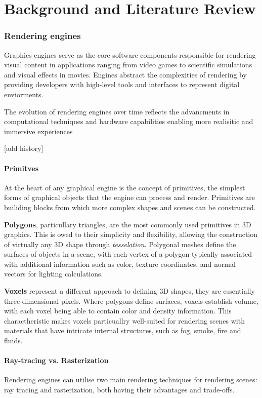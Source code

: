 
\part{Background and Literature Review}
\section{Rendering engines}
Graphics engines serve as the core software components responsible for rendering visual content in applications ranging from video games to scientific simulations and visual effects in movies.
Engines abstract the complexities of rendering by providing developers with high-level tools and interfaces to represent digital enviorments.

The evolution of rendering engines over time reflects the advancments in computational techniques and hardware capabilities enabling more realisitic and immersive experiences

[add history]
\subsection{Primitves}
At the heart of any graphical engine is the concept of primitives, the simplest forms of graphical objects that the engine can process and render. Primitives are builiding blocks from which more complex shapes and scenes can be constructed.

\textbf{Polygons}, particullary triangles, are the most commonly used primitives in 3D graphics. This is owed to their simplicity and flexibility, allowing the construction of virtually any 3D shape through \emph{tesselation}. Polygonal meshes define the surfaces of objects in a scene, with each vertex of a polygon typically associated with additional information such as color, texture coordinates, and normal vectors for lighting calculations.

\textbf{Voxels} represent a different approach to defining 3D shapes, they are essentially three-dimensional pixels. Where polygons define surfaces, voxels establish volume, with each voxel being able to contain color and density information.
This charactheristic makes voxels particuallry well-suited for rendering scenes with materials that have intricate internal structures, such as fog, smoke, fire and fluids.

\subsection{Ray-tracing vs. Rasterization}
Rendering engines can utilise two main rendering techniques for rendering scenes: ray tracing and rasterization, both having their advantages and trade-offs.

